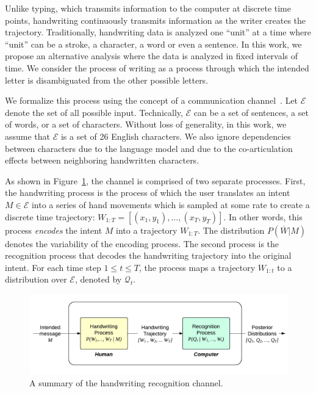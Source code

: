 \documentclass{sigchi}
\begin{document}
Unlike typing, which transmits information to the computer at discrete
time points, handwriting continuously transmits information as the
writer creates the trajectory. Traditionally, handwriting data is
analyzed one ``unit'' at a time where ``unit'' can be a stroke, a
character, a word or even a sentence. In this work, we propose an
alternative analysis where the data is analyzed in fixed intervals of
time. We consider the process of writing as a process through which
the intended letter is disambiguated from the other possible letters.

\newcommand{\intent}{M}
\newcommand{\intentSet}{\mathcal{E}}
\newcommand{\intentDist}{\mathcal{M}}
\newcommand{\pred}[1]{\mathcal{Q}_{#1}}
\newcommand{\predFinal}{\pred{\mathrm{final}}}
\newcommand{\writing}[1]{W_{1:{#1}}}
\newcommand{\writingVec}{\overline{W}}
\newcommand{\writingDist}{P(\writingVec | \intent)}
\newcommand{\tFinal}{T}
\newcommand{\expectedDuration}{\mathbb{E} \left[\tFinal\right]}
\newcommand{\condEntropy}{H(\predFinal | \intent)}

We formalize this process using the concept of a communication
channel~\cite{Shannon1948}.  Let $\intentSet$ denote the set of all
possible input. Technically, $\intentSet$ can be a set of sentences, a
set of words, or a set of characters. Without loss of generality, in
this work, we assume that $\intentSet$ is a set of 26 English
characters. We also ignore dependencies between characters due to
the language model and due to the co-articulation effects between
neighboring handwritten characters.

As shown in Figure~\ref{fig:hwr_channel}, the channel is comprised of
two separate processes. First, the handwriting process is the process
of which the user translates an intent $\intent \in \intentSet$ into a
series of hand movements which is sampled at some rate to create a
discrete time trajectory: $\writing{T} = \left[ (x_1,y_1), \ldots,
  (x_T,y_T) \right]$. In other words, this process {\em encodes} the
intent $\intent$ into a trajectory $\writing{T}$. The distribution
$\writingDist$ denotes the variability of the encoding process. The
second process is the recognition process that decodes the handwriting
trajectory into the original intent. For each time step $1 \le t \le
T$, the process maps a trajectory $\writing{t}$ to a distribution over
$\intentSet$, denoted by $\pred{t}$.

\begin{figure}[!t]
  \centering
  \includegraphics[width=0.9\columnwidth]{figures/hwr_channel.pdf}
  \caption{A summary of the handwriting recognition channel.}
  \label{fig:hwr_channel}
\end{figure}
\end{document}
